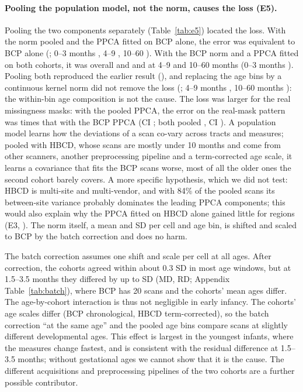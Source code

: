 \documentclass[11pt]{article}
\begin{document}
\paragraph{Pooling the population model, not the norm, causes the loss (E5).} Pooling the two components separately
(Table~\ref{tab:e5}) located the loss. With the norm pooled and the PPCA fitted on BCP alone, the error was equivalent to
BCP alone (\eFiveA; 0--3 months \eFiveABinA, 4--9 \eFiveABinB, 10--60 \eFiveABinC). With the BCP norm and a PPCA fitted on
both cohorts, it was \eFiveB{} overall and \eFiveBBinB{} and \eFiveBBinC{} at 4--9 and 10--60 months (0--3 months
\eFiveBBinA). Pooling both reproduced the earlier result (\eFiveC), and replacing the age bins by a continuous kernel norm
did not remove the loss (\eFiveCK; 4--9 months \eFiveCKBinB, 10--60 months \eFiveCKBinC): the within-bin age composition
is not the cause. The loss was larger for the real missingness masks: with the pooled PPCA, the error on the real-mask
pattern was \eFiveRealB{} times that with the BCP PPCA (CI \eFiveRealBCi; both pooled \eFiveRealC, CI \eFiveRealCCi).
A population model learns how the deviations of a scan co-vary across tracts and measures; pooled with HBCD, whose scans
are mostly under 10 months and come from other scanners, another preprocessing pipeline and a term-corrected age scale,
it learns a covariance that fits the BCP scans worse, most of all the older ones the second cohort barely covers. A
more specific hypothesis, which we did not test: HBCD is multi-site and multi-vendor, and with 84\% of the pooled scans
its between-site variance probably dominates the leading PPCA components; this would also explain why the PPCA fitted on
HBCD alone gained little for regions (E3, \eThreeDefRegion). The norm
itself, a mean and SD per cell and age bin, is shifted and scaled to BCP by the batch correction and does no harm.

The batch correction assumes one shift and scale per cell at all ages. After correction, the cohorts agreed within about
0.3 SD in most age windows, but at 1.5--3.5 months they differed by up to \bcMaxAbs{} SD (MD, RD; Appendix
Table~\ref{tab:batch}), where BCP has 20 scans and the cohorts' mean ages differ. The age-by-cohort interaction is thus not
negligible in early infancy. The cohorts' age scales differ (BCP chronological, HBCD term-corrected), so the batch
correction ``at the same age'' and the pooled age bins compare scans at slightly different developmental ages. This
effect is largest in the youngest infants, where the measures change fastest, and is consistent with the residual
difference at 1.5--3.5 months; without gestational ages we cannot show that it is the cause. The different acquisitions and preprocessing
pipelines of the two cohorts are a further possible contributor.
\end{document}

